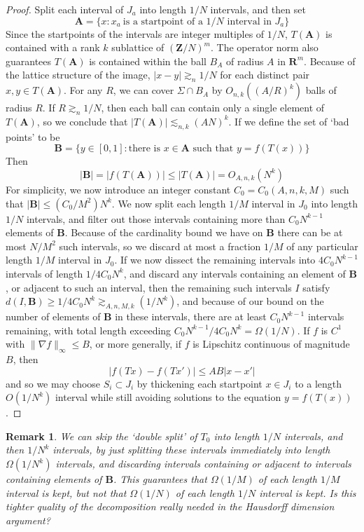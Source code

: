 \documentclass{report}
\theoremstyle{plain}
\theoremstyle{plain}
\newtheorem*{remark}{Remark}
\begin{document}
\begin{proof}
Split each interval of $J_a$ into length $1/N$ intervals, and then set
%
\[ \mathbf{A} = \{ x : x_a\ \text{is a startpoint of a $1/N$ interval in $J_a$} \} \]
%
Since the startpoints of the intervals are integer multiples of $1/N$, $T(\mathbf{A})$ is contained with a rank $k$ sublattice of $(\mathbf{Z}/N)^m$. The operator norm also guarantees $T(\mathbf{A})$ is contained within the ball $B_A$ of radius $A$ in $\mathbf{R}^m$. Because of the lattice structure of the image, $| x - y | \gtrsim_n 1/N$ for each distinct pair $x,y \in T(\mathbf{A})$. For any $R$, we can cover $\Sigma \cap B_A$ by $O_{n,k}((A/R)^k)$ balls of radius $R$. If $R \gtrsim_n 1/N$, then each ball can contain only a single element of $T(\mathbf{A})$, so we conclude that $|T(\mathbf{A})| \lesssim_{n,k} (AN)^k$. If we define the set of `bad points' to be
%
\[ \mathbf{B} = \{ y \in [0,1] : \text{there is $x \in \mathbf{A}$ such that $y = f(T(x))$} \} \]
%
Then
%
\[ |\mathbf{B}| = |f(T(\mathbf{A}))| \leq |T(\mathbf{A})| = O_{A,n,k}(N^k) \]
%
For simplicity, we now introduce an integer constant $C_0 = C_0(A,n,k,M)$ such that $|\mathbf{B}| \leq (C_0/M^2) N^k$. We now split each length $1/M$ interval in $J_0$ into length $1/N$ intervals, and filter out those intervals containing more than $C_0N^{k-1}$ elements of $\mathbf{B}$. Because of the cardinality bound we have on $\mathbf{B}$ there can be at most $N/M^2$ such intervals, so we discard at most a fraction $1/M$ of any particular length $1/M$ interval in $J_0$. If we now dissect the remaining intervals into $4C_0N^{k-1}$ intervals of length $1/4C_0N^k$, and discard any intervals containing an element of $\mathbf{B}$, or adjacent to such an interval, then the remaining such intervals $I$ satisfy $d(I,\mathbf{B}) \geq 1/4C_0N^k \gtrsim_{A,n,M,k}(1/N^k)$, and because of our bound on the number of elements of $\mathbf{B}$ in these intervals, there are at least $C_0N^{k-1}$ intervals remaining, with total length exceeding $C_0N^{k-1}/4C_0N^k = \Omega(1/N)$. If $f$ is $C^1$ with $\| \nabla f \|_\infty \leq B$, or more generally, if $f$ is Lipschitz continuous of magnitude $B$, then
%
\[ | f(Tx) - f(Tx')| \leq AB |x - x'| \]
%
and so we may choose $S_i \subset J_i$ by thickening each startpoint $x \in J_i$ to a length $O(1/N^k)$ interval while still avoiding solutions to the equation $y = f(T(x))$.
\end{proof}

\begin{remark}
    We can skip the `double split' of $T_0$ into length $1/N$ intervals, and then $1/N^k$ intervals, by just splitting these intervals immediately into length $\Omega(1/N^k)$ intervals, and discarding intervals containing or adjacent to intervals containing elements of $\mathbf{B}$. This guarantees that $\Omega(1/M)$ of each length $1/M$ interval is kept, but not that $\Omega(1/N)$ of each length $1/N$ interval is kept. Is this tighter quality of the decomposition really needed in the Hausdorff dimension argument?
\end{remark}
\end{document}
